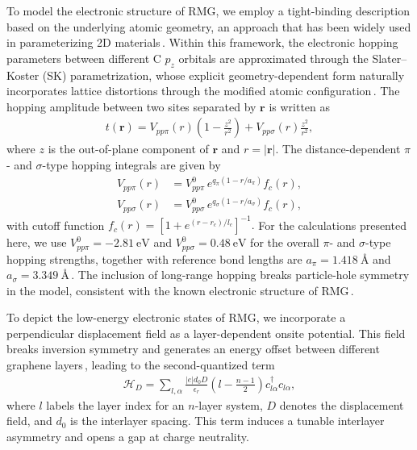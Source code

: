 \documentclass[aps,prx,article,twocolumn,amsmath,amssymb,superscriptaddress,longbibliography]{revtex4-2}
\begin{document}
To model the electronic structure of RMG, we employ a tight-binding description based on the underlying atomic geometry, an approach that has been widely used in parameterizing 2D materials\,\cite{fang2015ab,koshino2018maximally,miao2023truncated, vafek2023continuum}. Within this framework, the electronic hopping parameters between different C $p_z$ orbitals are approximated through the Slater--Koster (SK) parametrization, whose explicit geometry-dependent form naturally incorporates lattice distortions through the modified atomic configuration\,\cite{slater1954simplified}. The hopping amplitude between two sites separated by $\mathbf{r}$ is written as
\begin{align}
   t(\mathbf{r}) = V_{pp\pi}(r)\left(1-\frac{z^2}{r^2}\right) + V_{pp\sigma}(r)\frac{z^2}{r^2}, 
\end{align}
where $z$ is the out-of-plane component of $\mathbf{r}$ and $r = |\mathbf{r}|$. The distance-dependent $\pi$- and $\sigma$-type hopping integrals are given by
\begin{align}
V_{pp\pi}(r) &= V_{pp\pi}^0 \, e^{q_\pi (1 - r/a_\pi)} f_c(r),\\
V_{pp\sigma}(r) &= V_{pp\sigma}^0 \, e^{q_\sigma (1 - r/a_\sigma)} f_c(r),
\end{align}
with cutoff function $f_c(r) = \left[1 + e^{(r - r_c)/l_c}\right]^{-1}.$
For the calculations presented here, we use $V_{pp\pi}^0 = -2.81~\mathrm{eV}$ and $V_{pp\sigma}^0 = 0.48~\mathrm{eV}$ for the overall $\pi$- and $\sigma$-type hopping strengths, together with reference bond lengths are $a_\pi = 1.418~\text{\AA}$ and $a_\sigma = 3.349~\text{\AA}$\,\cite{herzogarbeitman2024moire}. The inclusion of long-range hopping breaks particle-hole symmetry in the model, consistent with the known electronic structure of RMG\,\cite{huang2023spin, koh2024correlated, herzogarbeitman2024moire,wolf2024magnetism,parramartinez2025nematic}.


To depict the low-energy electronic states of RMG, we incorporate a perpendicular displacement field as a layer-dependent onsite potential. This field breaks inversion symmetry and generates an energy offset between different graphene layers\,\cite{herzogarbeitman2024moire}, leading to the second-quantized term
\begin{align}
\mathcal{H}_D = \sum_{l,\alpha} \frac{|e| d_0 D}{\epsilon_r} \left(l - \frac{n-1}{2}\right) c^\dagger_{l\alpha} c_{l\alpha},
\end{align}
where $l$ labels the layer index for an $n$-layer system, $D$ denotes the displacement field, and $d_0$ is the interlayer spacing. This term induces a tunable interlayer asymmetry and opens a gap at charge neutrality.
\end{document}
